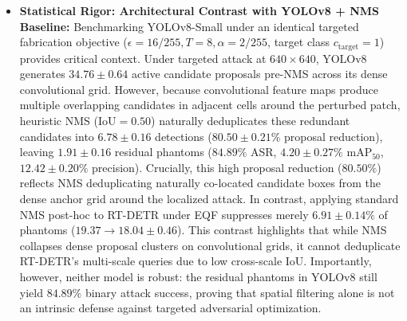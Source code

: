 \documentclass[preprint,12pt]{elsarticle}
\begin{document}
\begin{itemize}
    \item \textbf{Statistical Rigor: Architectural Contrast with YOLOv8 + NMS Baseline:} Benchmarking YOLOv8-Small under an identical targeted fabrication objective ($\epsilon=16/255, T=8, \alpha=2/255$, target class $c_{\mathrm{target}}=1$) provides critical context. Under targeted attack at $640\times 640$, YOLOv8 generates $34.76 \pm 0.64$ active candidate proposals pre-NMS across its dense convolutional grid. However, because convolutional feature maps produce multiple overlapping candidates in adjacent cells around the perturbed patch, heuristic NMS ($\mathrm{IoU}=0.50$) naturally deduplicates these redundant candidates into $6.78 \pm 0.16$ detections ($80.50 \pm 0.21\%$ proposal reduction), leaving $1.91 \pm 0.16$ residual phantoms ($84.89\%$ ASR, $4.20 \pm 0.27\%$ $\mathrm{mAP}_{50}$, $12.42 \pm 0.20\%$ precision). Crucially, this high proposal reduction ($80.50\%$) reflects NMS deduplicating naturally co-located candidate boxes from the dense anchor grid around the localized attack. In contrast, applying standard NMS post-hoc to RT-DETR under EQF suppresses merely $6.91 \pm 0.14\%$ of phantoms ($19.37 \to 18.04 \pm 0.46$). This contrast highlights that while NMS collapses dense proposal clusters on convolutional grids, it cannot deduplicate RT-DETR's multi-scale queries due to low cross-scale IoU. Importantly, however, neither model is robust: the residual phantoms in YOLOv8 still yield $84.89\%$ binary attack success, proving that spatial filtering alone is not an intrinsic defense against targeted adversarial optimization.
\end{itemize}
\end{document}
